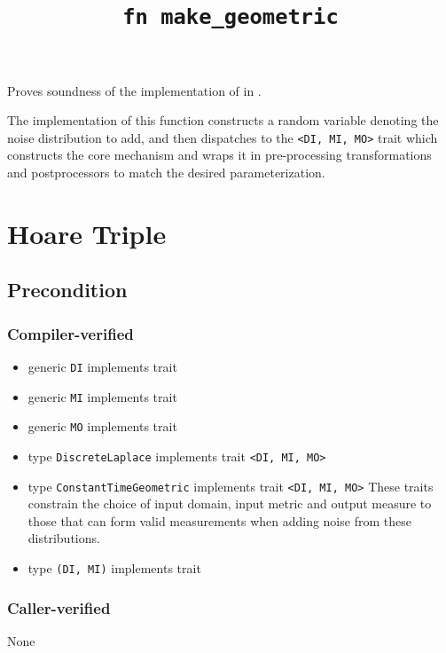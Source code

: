 \documentclass{article}
\title{\texttt{fn make\_geometric}}
\author{\MichaelShoemateAuthor}
\date{}
\begin{document}
\maketitle

\contrib
Proves soundness of the implementation of  in .

The implementation of this function constructs a random variable denoting the noise distribution to add,
and then dispatches to the \texttt{<DI, MI, MO>} trait
which constructs the core mechanism and wraps it in pre-processing transformations and postprocessors to match the desired parameterization.

\section{Hoare Triple}
\subsection*{Precondition}
\subsubsection*{Compiler-verified}
\begin{itemize}
    \item generic \texttt{DI} implements trait 
    \item generic \texttt{MI} implements trait 
    \item generic \texttt{MO} implements trait 
    \item type \texttt{DiscreteLaplace} implements trait \texttt{<DI, MI, MO>}
    \item type \texttt{ConstantTimeGeometric} implements trait \texttt{<DI, MI, MO>}
        These traits constrain the choice of input domain, input metric and output measure
        to those that can form valid measurements when adding noise from these distributions.
    \item type \texttt{(DI, MI)} implements trait 
\end{itemize}

\subsubsection*{Caller-verified}
None
\end{document}
